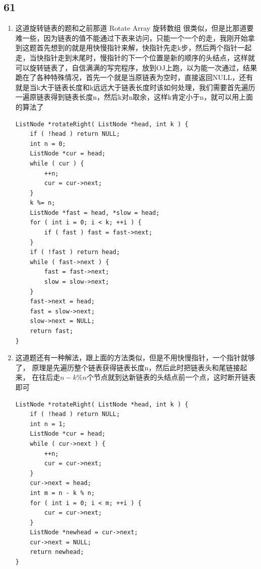 \documentclass[12pt,a4paper]{article}
\begin{document}
\subsection{61}
\begin{enumerate}
\item
\begin{CJK}{UTF8}{gbsn}
这道旋转链表的题和之前那道 Rotate Array 旋转数组 很类似，但是比那道要难一些，因为链表的值不能通过下表来访问，只能一个一个的走，我刚开始拿到这题首先想到的就是用快慢指针来解，快指针先走k步，然后两个指针一起走，当快指针走到末尾时，慢指针的下一个位置是新的顺序的头结点，这样就可以旋转链表了，自信满满的写完程序，放到OJ上跑，以为能一次通过，结果跪在了各种特殊情况，首先一个就是当原链表为空时，直接返回NULL，还有就是当k大于链表长度和k远远大于链表长度时该如何处理，我们需要首先遍历一遍原链表得到链表长度n，然后k对n取余，这样k肯定小于n，就可以用上面的算法了
\end{CJK}
\begin{lstlisting}
ListNode *rotateRight( ListNode *head, int k ) {
	if ( !head ) return NULL;
	int n = 0;
	ListNode *cur = head;
	while ( cur ) {
		++n;
		cur = cur->next;
	}
	k %= n;
	ListNode *fast = head, *slow = head;
	for ( int i = 0; i < k; ++i ) {
		if ( fast ) fast = fast->next;
	}
	if ( !fast ) return head;
	while ( fast->next ) {
		fast = fast->next;
		slow = slow->next;
	}
	fast->next = head;
	fast = slow->next;
	slow->next = NULL;
	return fast;
}
\end{lstlisting}
\item
\begin{CJK}{UTF8}{gbsn}
这道题还有一种解法，跟上面的方法类似，但是不用快慢指针，一个指针就够了，
原理是先遍历整个链表获得链表长度n，然后此时把链表头和尾链接起来，
在往后走$n - k \% n$个节点就到达新链表的头结点前一个点，这时断开链表即可
\end{CJK}
\begin{lstlisting}
ListNode *rotateRight( ListNode *head, int k ) {
	if ( !head ) return NULL;
	int n = 1;
	ListNode *cur = head;
	while ( cur->next ) {
		++n;
		cur = cur->next;
	}
	cur->next = head;
	int m = n - k % n;
	for ( int i = 0; i < m; ++i ) {
		cur = cur->next;
	}
	ListNode *newhead = cur->next;
	cur->next = NULL;
	return newhead;
}
\end{lstlisting}
\end{enumerate}
\end{document}
